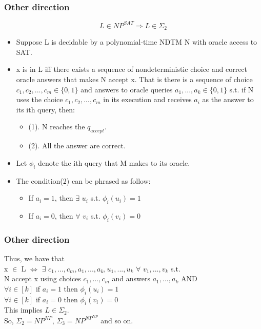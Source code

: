 \documentclass{beamer}
\begin{document}
\begin{frame}
\frametitle{Other direction}
$$
L \in NP^{SAT} \Rightarrow  L \in \Sigma_{2}
$$
\begin{itemize}
	\item Suppose L is decidable by a polynomial-time NDTM N with oracle access to SAT.
	\item x is in L iff there exists a sequence of nondeterministic choice and correct oracle answers that makes N accept x. That is there is a sequence of choice $c_{1}, c_{2}, ..., c_{m} \in \{0,1\}$ and answers to oracle queries $a_{1},...,a_{k} \in \{0,1\}$ s.t. if N uses the choice $c_{1}, c_{2}, ..., c_{m}$ in its execution and receives $a_{i}$ as the answer to its ith query, then:
	\begin{itemize}
		\item (1). N reaches the $q_{accept}$.
		\item (2). All the answer are correct.
	\end{itemize}
	\item Let $\phi_{i}$ denote the ith query that M makes to its oracle.
	\item The condition(2) can be phrased as follow:
	\begin{itemize}
		\item If $a_{i} = 1$, then $\exists$ $u_{i}$ s.t. $\phi_{i}(u_{i}) = 1$
		\item If $a_{i} = 0$, then $\forall$ $v_{i}$ s.t. $\phi_{i}(v_{i}) = 0$
	\end{itemize}
\end{itemize}
\end{frame}
\begin{frame}
\frametitle{Other direction}
Thus, we have that\\
x $\in$ L $\Leftrightarrow$ $\exists$ $c_{1},...,c_{m},a_{1},...,a_{k},u_{1},...,u_{k}$ $\forall$ $v_{1},...,v_{k}$ s.t.\\
N accept x using choices $c_{1},...,c_{m}$ and answers $a_{1},...,a_{k}$ AND\\
$\forall i \in [k]$ if $a_{i} = 1$ then $\phi_{i}(u_{i}) = 1$\\
$\forall i \in [k]$ if $a_{i} = 0$ then $\phi_{i}(v_{i}) = 0$\\
This implies $L \in \Sigma_{2}$.\\
So, $\Sigma_{2} = NP^{NP}$, $\Sigma_{3} = NP^{NP^{NP}}$ and so on.\\
\end{frame}
\end{document}
